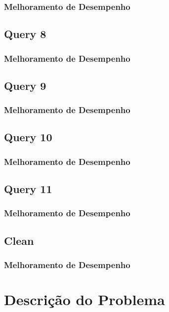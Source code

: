 \documentclass[a4paper]{article}
\begin{document}
\subsubsection{Melhoramento de Desempenho}

\subsection{Query 8}

\subsubsection{Melhoramento de Desempenho}

\subsection{Query 9}

\subsubsection{Melhoramento de Desempenho}

\subsection{Query 10}

\subsubsection{Melhoramento de Desempenho}

\subsection{Query 11}

\subsubsection{Melhoramento de Desempenho}

\subsection{Clean}

\subsubsection{Melhoramento de Desempenho}


\section{Descrição do Problema}
\label{sec:problema}
\end{document}
